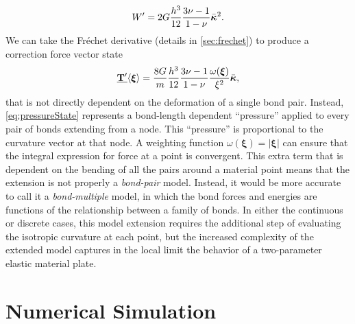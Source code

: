 \documentclass[preprint,review,12pt]{elsarticle}
\newcommand\vstate[3]{%
	\mathbf{\underline{#1}}%
	\ifstrempty{#2}{}{[#2]}%
	\ifstrempty{#3}{}{\langle #3 \rangle}}
\begin{document}
%
\begin{equation}
    W'=2G\frac{h^3}{12}\frac{3\nu-1}{1-\nu}\bar{\boldsymbol{\kappa}}^2. \notag
\end{equation}
%
We can take the Fr\'{e}chet derivative (details in \cref{sec:frechet}) to produce a correction force vector state
%
\begin{equation}
    \vstate{T'}{}{\boldsymbol{\xi}}=\frac{8G}{m}\frac{h^3}{12}\frac{3\nu-1}{1-\nu}\frac{\omega(\boldsymbol{\xi})}{\xi^2} \bar{\boldsymbol{\kappa}},
    \label{eq:pressureState}
\end{equation}
%
that is not directly dependent on the deformation of a single bond pair.  Instead, \cref{eq:pressureState} represents a bond-length dependent ``pressure'' applied to every pair of bonds extending from a node.  This ``pressure'' is proportional to the curvature vector at that node.
A weighting function \(\omega(\boldsymbol{\xi}) = |\boldsymbol{\xi}|\) can ensure that the integral expression for force at a point is convergent.  This extra term that is dependent on the bending of all the pairs around a material point means that the extension is not properly a \textit{bond-pair} model.  Instead, it would be more accurate to call it a \textit{bond-multiple} model, in which the bond forces and energies are functions of the relationship between a family of bonds.  In either the continuous or discrete cases, this model extension requires the additional step of evaluating the isotropic curvature at each point, but the increased complexity of the extended model captures in the local limit the behavior of a two-parameter elastic material plate.
%
\section{Numerical Simulation}
\end{document}
